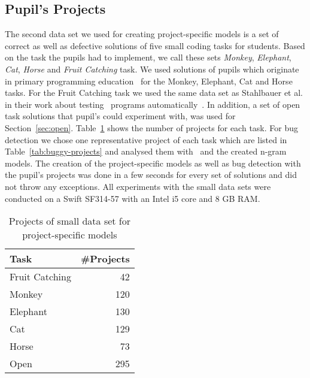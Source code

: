 \subsection{Pupil's Projects}\label{subsec:bugset}
The second data set we used for creating project-specific models is a set of correct as well as defective solutions of five small coding tasks for students. Based on the task the pupils had to implement, we call these sets \textit{Monkey}, \textit{Elephant}, \textit{Cat}, \textit{Horse} and \textit{Fruit Catching} task. We used solutions of pupils which originate in primary programming education~\cite{katharina} for the Monkey, Elephant, Cat and Horse tasks. For the Fruit Catching task we used the same data set as Stahlbauer et al. in their work about testing \scratch\ programs automatically~\cite{whisker}. In addition, a set of open task solutions that pupil's could experiment with, was used for Section~\ref{sec:open}. Table~\ref{tab:small-dataset} shows the number of projects for each task. For bug detection we chose one representative project of each task which are listed in Table~\ref{tab:buggy-projects} and analysed them with \litterbox\ and the created n-gram models. The creation of the project-specific models as well as bug detection with the pupil's projects was done in a few seconds for every set of solutions and did not throw any exceptions. All experiments with the small data sets were conducted on a Swift SF314-57 with an Intel i5 core and 8 GB RAM.
 
\begin{table}[H]
    \centering
    \caption[Projects of small data set]{\label{tab:small-dataset}Projects of small data set for project-specific models}
    \begin{tabular}{lr}
        \toprule
        Task & \#Projects \\
        \midrule
        Fruit Catching & 42 \\
        Monkey & 120 \\
        Elephant & 130 \\
        Cat & 129 \\
        Horse & 73 \\
        Open & 295 \\
        \bottomrule
    \end{tabular}
\end{table}

